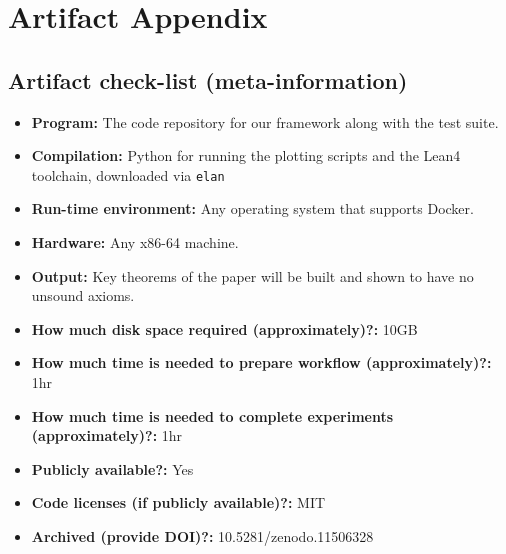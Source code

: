 \documentclass{sigplanconf}
\begin{document}


\appendix
\section{Artifact Appendix}



\subsection{Artifact check-list (meta-information)}


{\small
\begin{itemize}
  \item {\bf Program: } The code repository for our framework along with the test suite.
  \item {\bf Compilation: } Python for running the plotting scripts and the Lean4 toolchain, downloaded via \texttt{elan}
  \item {\bf Run-time environment: } Any operating system that supports Docker.
  \item {\bf Hardware: } Any x86-64 machine.
  \item {\bf Output: } Key theorems of the paper will be built and shown to have no unsound axioms.
  \item {\bf How much disk space required (approximately)?: } 10GB
  \item {\bf How much time is needed to prepare workflow (approximately)?: } 1hr
  \item {\bf How much time is needed to complete experiments (approximately)?: } 1hr
  \item {\bf Publicly available?: } Yes
  \item {\bf Code licenses (if publicly available)?: } MIT
  \item {\bf Archived (provide DOI)?: } 10.5281/zenodo.11506328
\end{itemize}
}
\end{document}
